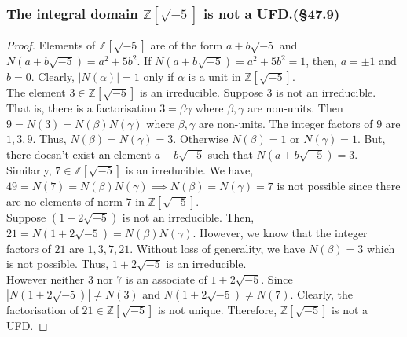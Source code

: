 \subsubsection{The integral domain $\mathbb{Z}[\sqrt{-5}]$ is not a UFD.(\S47.9)}
\begin{proof}
Elements of $\mathbb{Z}[\sqrt{-5}]$ are of the form $a+b\sqrt{-5}$ and $N(a+b\sqrt{-5}) = a^2 + 5b^2$.
If $N(a+b\sqrt{-5}) = a^2+5b^2 = 1$, then, $a = \pm 1$ and $b = 0$.
Clearly, $|N(\alpha)| = 1$ only if $\alpha$ is a unit in $\mathbb{Z}[\sqrt{-5}]$.\\

The element $3 \in \mathbb{Z}[\sqrt{-5}]$ is an irreducible.
Suppose $3$ is not an irreducible.
That is, there is a factorisation $3 = \beta\gamma$ where $\beta,\gamma$ are non-units.
Then $9 = N(3) = N(\beta)N(\gamma)$ where $\beta,\gamma$ are non-units.
The integer factors of $9$ are $1,3,9$.
Thus, $N(\beta) = N(\gamma) = 3$.
Otherwise $N(\beta) = 1$ or $N(\gamma) = 1$.
But, there doesn't exist an element $a+b\sqrt{-5}$ such that $N(a+b\sqrt{-5}) = 3$.
Similarly, $7 \in \mathbb{Z}[\sqrt{-5}]$ is an irreducible.
We have, $49 = N(7) = N(\beta)N(\gamma) \implies N(\beta)=N(\gamma) = 7$ is not possible since there are no elements of norm $7$ in $\mathbb{Z}[\sqrt{-5}]$.\\

Suppose $(1+2\sqrt{-5})$ is not an irreducible.
Then, $21 = N(1+2\sqrt{-5}) = N(\beta)N(\gamma)$.
However, we know that the integer factors of $21$ are $1,3,7,21$.
Without loss of generality, we have $N(\beta) = 3$ which is not possible.
Thus, $1+2\sqrt{-5}$ is an irreducible.\\

However neither $3$ nor $7$ is an associate of $1+2\sqrt{-5}$.
Since $|N(1+2\sqrt{-5})| \ne N(3)$ and $N(1+2\sqrt{-5}) \ne N(7)$.
Clearly, the factorisation of $21 \in \mathbb{Z}[\sqrt{-5}]$ is not unique.
Therefore, $\mathbb{Z}[\sqrt{-5}]$ is not a UFD.
\end{proof}
